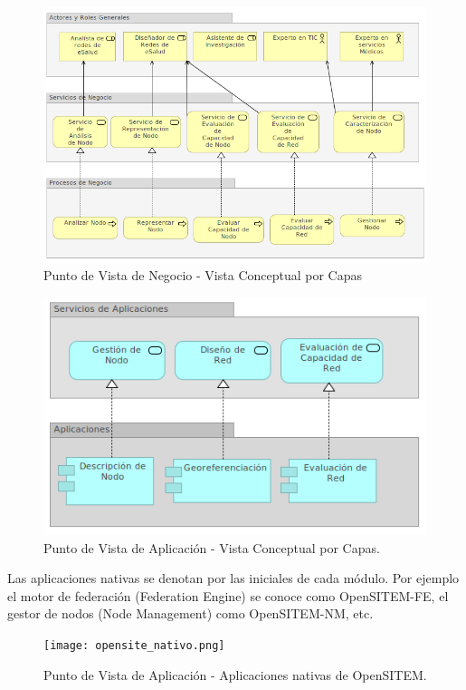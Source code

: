 \begin{figure}
 \centering
 \includegraphics[width=120mm]{negocio_vista_por_capas.png}
 \caption{Punto de Vista de Negocio - Vista Conceptual por Capas}
 \label{punto_negocio}
\end{figure}

\begin{figure}
 \centering
 \includegraphics[width=120mm]{punto_aplicacion.png}
 \caption{Punto de Vista de Aplicación - Vista Conceptual por Capas.}
 \label{punto_aplicacion}
\end{figure}

Las aplicaciones nativas se denotan por las iniciales de cada módulo. Por ejemplo el motor de federación (Federation Engine) se conoce como OpenSITEM-FE, el gestor de nodos (Node Management) como OpenSITEM-NM, etc.

\begin{figure}
 \centering
 \texttt{[image: opensite\_nativo.png]}
 \caption{Punto de Vista de Aplicación - Aplicaciones nativas de OpenSITEM.}
 \label{punto_aplicacion}
\end{figure}


